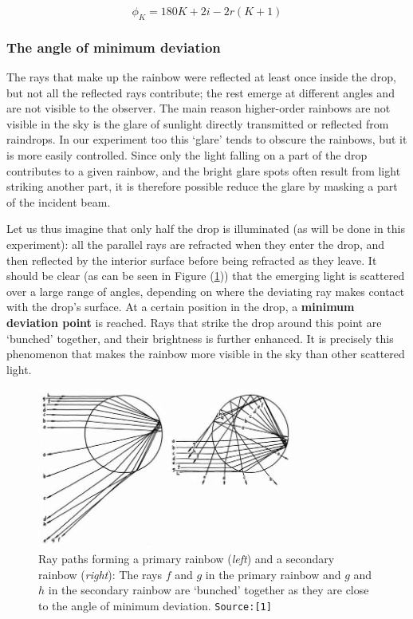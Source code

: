 \begin{equation}
    \phi_K = 180K + 2i - 2r(K+1)
    \label{mindevK}
\end{equation}


\subsubsection*{The angle of minimum deviation}

The rays that make up the rainbow were reflected at least once inside the drop, but not all the reflected rays contribute; the rest emerge at different angles and are not visible to the observer. The main reason higher-order rainbows are not visible in the sky is the glare of sunlight directly transmitted or reflected from raindrops. In our experiment too this `glare' tends to obscure the rainbows, but it is more easily controlled. Since only the light falling on a part of the drop contributes to a given rainbow, and the bright glare spots often result from light striking another part, it is therefore possible reduce the glare by masking a part of the incident beam.

Let us thus imagine that only half the drop is illuminated (as will be done in this experiment): all the parallel rays are refracted when they enter the drop, and then reflected by the interior surface before being refracted as they leave. It should be clear (as can be seen in Figure (\ref{fig:rainbowDeviation})) that the emerging light is scattered over a large range of angles, depending on where the deviating ray makes contact with the drop's surface. At a certain position in the drop, a \textbf{minimum deviation point} is reached. Rays that strike the drop around this point are `bunched' together, and their brightness is further enhanced. It is precisely this phenomenon that makes the rainbow more visible in the sky than other scattered light. 


\begin{figure}[!htb]
    \centering
    \includegraphics[width=0.75\textwidth]{figs/rainbowDeviation.jpeg}
    \caption{Ray paths forming a primary rainbow (\textit{left}) and a secondary rainbow (\textit{right}): The rays $f$ and $g$ in the primary rainbow and $g$ and $h$ in the secondary rainbow are `bunched' together as they are close to the angle of minimum deviation. \texttt{Source:[1]}}
    \label{fig:rainbowDeviation}
\end{figure}



